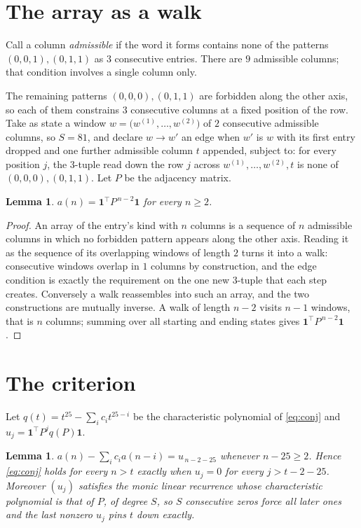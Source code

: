 \documentclass[11pt,a4paper]{article}
\theoremstyle{plain}
\newtheorem{lemma}[theorem]{Lemma}
\theoremstyle{definition}
\begin{document}
\section{The array as a walk}

Call a column \emph{admissible} if the word it forms contains none of the patterns
$(0,0,1), (0,1,1)$ as $3$ consecutive entries. There are $9$ admissible columns; that condition
involves a single column only.

The remaining patterns $(0,0,0), (0,1,1)$ are forbidden along the other axis, so each of them
constrains $3$ consecutive columns at a fixed position of the row. Take as state a
window $w=\bigl(w^{(1)},\dots,w^{(2)}\bigr)$ of $2$ consecutive admissible
columns, so $S=81$, and declare $w\to w'$ an edge when $w'$ is $w$ with its first entry
dropped and one further admissible column $t$ appended, subject to: for every position
$j$, the $3$-tuple read down the row $j$ across $w^{(1)},\dots,w^{(2)},t$
is none of $(0,0,0), (0,1,1)$. Let $P$ be the adjacency matrix.

\begin{lemma}\label{lem:walk}
$a(n)=\mathbf{1}^{\!\top}P^{\,n-2}\mathbf{1}$ for every $n\ge2$.
\end{lemma}

\begin{proof}
An array of the entry's kind with $n$ columns is a sequence of $n$ admissible columns in
which no forbidden pattern appears along the other axis. Reading it as the sequence of its
overlapping windows of length $2$ turns it into a walk: consecutive windows overlap in
$1$ columns by construction, and the edge condition is exactly the requirement on the one
new $3$-tuple that each step creates. Conversely a walk reassembles into such an array,
and the two constructions are mutually inverse. A walk of length $n-2$ visits $n-1$
windows, that is $n$ columns; summing over all starting and ending states gives
$\mathbf{1}^{\!\top}P^{\,n-2}\mathbf{1}$.
\end{proof}

\section{The criterion}

Let $q(t)=t^{25}-\sum_i c_i t^{25-i}$ be the characteristic polynomial of
\eqref{eq:conj} and $u_j=\mathbf{1}^{\!\top}P^{j}q(P)\mathbf{1}$.

\begin{lemma}\label{lem:crit}
$a(n)-\sum_i c_i a(n-i)=u_{\,n-2-25}$ whenever $n-25\ge2$. Hence
\eqref{eq:conj} holds for every $n>t$ exactly when $u_j=0$ for every
$j>t-2-25$. Moreover $(u_j)$ satisfies the monic linear recurrence whose
characteristic polynomial is that of $P$, of degree $S$, so $S$ consecutive zeros force all
later ones and the last nonzero $u_j$ pins $t$ down exactly.
\end{lemma}
\end{document}
